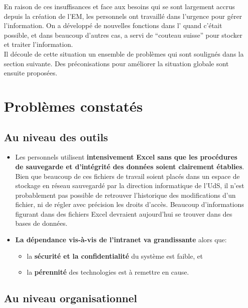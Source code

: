 \documentclass{book}
\begin{document}
En raison de ces insuffisances et face aux  besoins qui se sont largement
accrus depuis la création de l'EM, les personnels ont travaillé dans l'urgence pour gérer 
l'information. On a développé de nouvelles fonctions dans l' quand c'était
possible, et dans beaucoup d'autres cas,  a servi de ``couteau suisse'' pour 
stocker et traiter l'information.\\

Il découle de cette situation un ensemble de problèmes qui sont soulignés dans la section
suivante. Des préconisations pour améliorer la situation globale sont ensuite proposées.

\section{Problèmes constatés}

\subsection{Au niveau des outils}

\begin{itemize}
\item Les personnels utilisent \textbf{intensivement Excel sans que les procédures de 
sauvegarde et d'intégrité des données soient clairement établies}. Bien que beaucoup
de ces fichiers de travail soient placés dans un espace de stockage en réseau sauvegardé
par la direction informatique de l'UdS, il n'est probablement pas possible de retrouver
l'historique des modifications d'un fichier, ni de régler avec précision les droits d'accès.
Beaucoup d'informations figurant dans des fichiers Excel devraient aujourd'hui se trouver dans
des bases de données.\\

\item \textbf{La dépendance vis-à-vis de l'intranet va grandissante} alors que:
	\begin{itemize}
	\item la \textbf{sécurité et la confidentialité} du système est faible, et
	\item la \textbf{pérennité} des technologies est à remettre en cause.
	\end{itemize}
\end{itemize}

\subsection{Au niveau organisationnel}
\end{document}
